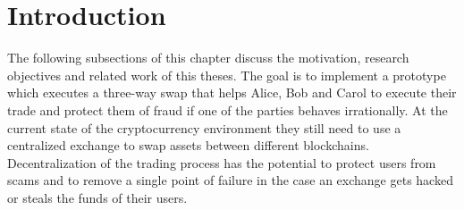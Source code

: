 %
%
\chapter{Introduction}
\label{ch:intro}
The following subsections of this chapter discuss the motivation, research objectives and related work of this theses. The goal is to implement a prototype which executes a three-way swap that helps Alice, Bob and Carol to execute their trade and protect them of fraud if one of the parties behaves irrationally. At the current state of the cryptocurrency environment they still need to use a centralized exchange to swap assets between different blockchains. Decentralization of the trading process has the potential to protect users from scams and to remove a single point of failure in the case an exchange gets hacked or steals the funds of their users.

%
%
